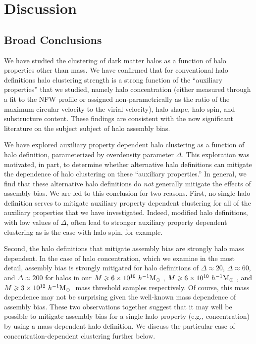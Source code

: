 \documentclass[usenatbib,fleqn]{mnras}
\begin{document}
\section{Discussion}
\label{section:discussion}

\subsection{Broad Conclusions}

We have studied the clustering of dark matter halos as a function of halo properties other than mass. We have confirmed that for conventional halo definitions halo clustering strength is a strong function of the  ``auxiliary properties'' that we studied, namely halo concentration (either measured through a fit to the NFW profile or assigned non-parametrically as the ratio of the maximum circular velocity to the virial velocity), halo shape, halo spin, and substructure content. These findings are consistent with the now significant literature on the subject subject of halo assembly bias. \citep{peacock_smith00, wechsler_etal02,sheth_tormen04, gao_etal05, zentner_etal05, allgood_etal06, harker_etal06, wechsler_etal06, croton_etal07, zentner07, dalal_etal08, zentner_etal14, mao_etal15, sunayama_etal16}

We have explored auxiliary property dependent halo clustering as a function of halo definition, parameterized by overdensity parameter $\Delta$. This exploration was motivated, in part, to determine whether alternative halo definitions can mitigate the dependence of halo clustering on these ``auxiliary properties.'' In general, we find that these alternative halo definitions do {\em not} generally mitigate the effects of assembly bias. We are led to this conclusion for two reasons. First, no single halo definition serves to mitigate auxiliary property dependent clustering for all of the auxiliary properties that we have investigated. Indeed, modified halo definitions, with low values of $\Delta$, often lead to stronger auxiliary property dependent clustering as is the case with halo spin, for example.

Second, the halo definitions that mitigate assembly bias are strongly halo mass dependent. In the case of halo concentration, which we examine in the most detail, assembly bias is strongly mitigated for halo definitions of $\Delta \approx 20$, $\Delta \approx 60$, and $\Delta \approx 200$ for halos in our $M \geqslant 6 \times 10^{10} \ h^{-1}\mathrm{M}_{\odot}~$, $M \geqslant 6 \times 10^{10} \ h^{-1}\mathrm{M}_{\odot}~$, and $M \geqslant 3 \times 10^{12} \ h^{-1}\mathrm{M}_{\odot}~$ mass threshold samples respectively. Of course, this mass dependence may not be surprising given the well-known mass dependence of assembly bias. These two observations together suggest that it may well be possible to mitigate assembly bias for a single halo property (e.g., concentration) by using a mass-dependent halo definition. We discuss the particular case of concentration-dependent clustering further below.
\end{document}
